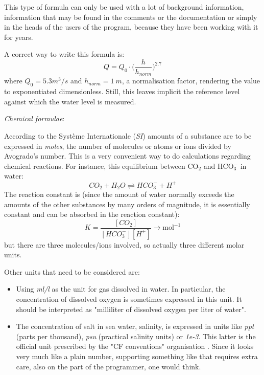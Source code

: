 \documentclass{article}
\begin{document}
This type of formula can only be used with a lot of background information, information that may be found in the
comments or the documentation or simply in the heads of the users of the program, because they have been working with
it for years.

A correct way to write this formula is:
%
\begin{equation}
    Q = Q_0 \cdot \bigl (\frac{h}{h_{norm}} \bigr)^{2.7}
\end{equation}
%
\noindent where $Q_0 = 5.3 m^3/s$ and $h_{norm} = 1~m$, a normalisation factor, rendering the value to exponentiated
dimensionless. Still, this leaves implicit the reference level against which the water level is measured.

\vspace{\baselineskip}
\noindent \emph{Chemical formulae}:

\noindent According to the Syst\`eme Internationale (\emph{SI}) amounts of a substance are to be expressed in \emph{moles}, the number of molecules or atoms
or ions divided by Avogrado's number. This is a very convenient way to do calculations regarding chemical reactions.
For instance, this equilibrium between CO$_2$ and HCO$_3^-$ in water:
\begin{equation}
    CO_2 + H_2O \rightleftharpoons HCO_3^- + H^+
\end{equation}
%
The reaction constant is (since the amount of water normally exceeds the amounts of the other substances by many
orders of magnitude, it is essentially constant and can be absorbed in the reaction constant):
\begin{equation}
    K = \frac{[CO_2]}{[HCO_3^-][H^+]} \rightarrow \textrm{mol}^{-1}
\end{equation}
%
\noindent but there are three molecules/ions involved, so actually three different molar units.

Other units that need to be considered are:
\begin{itemize}
\item
Using \emph{ml/l} as the unit for gas dissolved in water. In particular, the concentration of dissolved oxygen is
sometimes expressed in this unit. It should be interpreted as "milliliter of dissolved oxygen per liter of water".
\item
The concentration of salt in sea water, salinity, is expressed in units like \emph{ppt} (parts per thousand), \emph{psu}
(practical salinity units) or \emph{1e-3}. This latter is the official unit prescribed by the "CF conventions" organisation
\cite{CFConventionsStandardNames}.
Since it looks very much like a plain number, supporting something like that requires extra care, also on the part of
the programmer, one would think.
\end{itemize}
\end{document}
